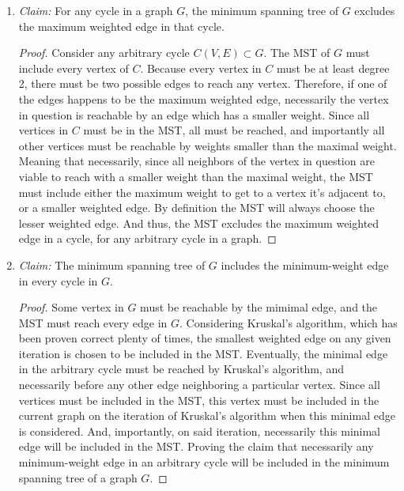 \documentclass{article}
\begin{document}
\begin{enumerate}
	\item \textit{Claim:} For any cycle in a graph $G$, the minimum spanning tree of $G$ excludes
		the maximum weighted edge in that cycle.
		\begin{proof}
			Consider any arbitrary cycle $C(V,E) \subset G$. The MST of $G$ must include
			every vertex of $C$. Because every vertex in $C$ must be at least degree 2, there
			must be two possible edges to reach any vertex. Therefore, if one of the edges happens
			to be the maximum weighted edge, necessarily the vertex in question is reachable by an
			edge which has a smaller weight. Since all vertices in $C$ must be in the MST, all must be
			reached, and importantly all other vertices must be reachable by weights smaller than the maximal
			weight. Meaning that necessarily, since all neighbors of the vertex in question are viable to
			reach with a smaller weight than the maximal weight, the MST must include either the maximum weight
			to get to a vertex it's adjacent to, or a smaller weighted edge. By definition the MST will always
			choose the lesser weighted edge. And thus, the MST excludes the maximum weighted edge in a cycle,
			for any arbitrary cycle in a graph.
		\end{proof}
	\item \textit{Claim:} The minimum spanning tree of $G$ includes the minimum-weight edge in every cycle in $G$.
		\begin{proof}
			Some vertex in $G$ must be reachable by the mimimal edge, and the MST must reach every edge in $G$.
			Considering Kruskal's algorithm, which has been proven correct plenty of times, the smallest weighted
			edge on any given iteration is chosen to be included in the MST. Eventually, the minimal edge in the
			arbitrary cycle must be reached by Kruskal's algorithm, and necessarily before any other edge neighboring
			a particular vertex. Since all vertices must be included in the MST, this vertex must be included in the current
			graph on the iteration of Kruskal's algorithm when this minimal edge is considered. And, importantly, on said
			iteration, necessarily this minimal edge will be included in the MST. Proving the claim that necessarily
			any minimum-weight edge in an arbitrary cycle will be included in the minimum spanning tree of a graph $G$.
		\end{proof}
\end{enumerate}
\end{document}
